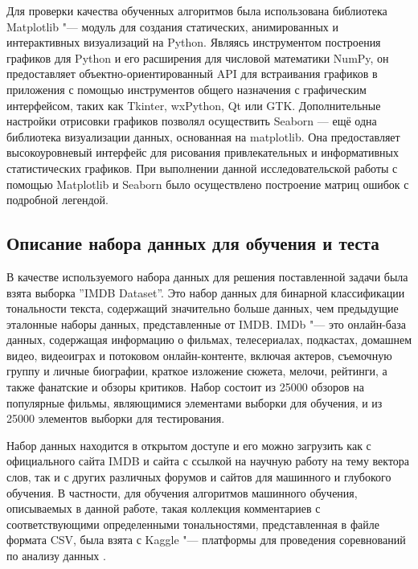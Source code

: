 \documentclass[bachelor, och, coursework]{SCWorks}
\begin{document}
        Для проверки качества обученных алгоритмов была использована библиотека
        Matplotlib "--- модуль для создания статических, анимированных и
        интерактивных визуализаций на Python. Являясь инструментом построения
        графиков для Python и его расширения для числовой математики NumPy, он
        предоставляет объектно-ориентированный API для встраивания графиков в
        приложения с помощью инструментов общего назначения с графическим
        интерфейсом, таких как Tkinter, wxPython, Qt или GTK. Дополнительные
        настройки отрисовки графиков позволял осуществить Seaborn — ещё одна
        библиотека визуализации данных, основанная на matplotlib. Она
        предоставляет высокоуровневый интерфейс для рисования привлекательных и
        информативных статистических графиков. При выполнении данной
        исследовательской работы с помощью Matplotlib и Seaborn было
        осуществлено построение матриц ошибок с подробной легендой.

    \subsection{Описание набора данных для обучения и теста}

        В качестве используемого набора данных для решения поставленной задачи
        была взята выборка ''IMDB Dataset''. Это набор данных для бинарной
        классификации тональности текста, содержащий значительно больше данных,
        чем предыдущие эталонные наборы данных, представленные от IMDB. IMDb
        "--- это онлайн-база данных, содержащая информацию о фильмах,
        телесериалах, подкастах, домашнем видео, видеоиграх и потоковом
        онлайн-контенте, включая актеров, съемочную группу и личные биографии,
        краткое изложение сюжета, мелочи, рейтинги, а также фанатские и обзоры
        критиков. Набор состоит из 25000 обзоров на популярные фильмы,
        являющимися элементами выборки для обучения, и из 25000 элементов
        выборки для тестирования.

        Набор данных находится в открытом доступе и его можно загрузить как с
        официального сайта IMDB и сайта с ссылкой на научную работу на тему
        вектора слов, так и с других различных форумов и сайтов для машинного и
        глубокого обучения. В частности, для обучения алгоритмов машинного
        обучения, описываемых в данной работе, такая коллекция комментариев с
        соответствующими определенными тональностями, представленная в файле
        формата CSV, была взята с Kaggle "--- платформы для проведения
        соревнований по анализу данных \cite{dataset3}.
\end{document}
